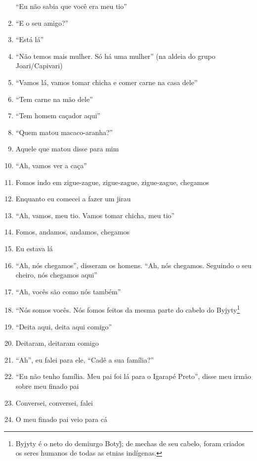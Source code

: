 \begin{enumerate}
 ``Eu não sabia que você era meu tio''
 \begin{center}\end{center}
 \item ``E o seu amigo?''
 \item ``Está lá''
 \item ``Não temos mais mulher. Só há uma mulher'' (na aldeia do grupo
 Joari/Capivari)
 \item ``Vamos lá, vamos tomar chicha e comer carne na casa dele''
 \item ``Tem carne na mão dele''
 \item ``Tem homem caçador aqui''
 \item ``Quem matou macaco-aranha?''
 \item Aquele que matou disse para mim
 \item ``Ah, vamos ver a caça''
 \item Fomos indo em zigue-zague, zigue-zague, zigue-zague, chegamos
 \item Enquanto eu comecei a fazer um jirau
 \item ``Ah, vamos, meu tio. Vamos tomar chicha, meu tio''
 \begin{center}\end{center}
 \item Fomos, andamos, andamos, chegamos
 \item Eu estava lá
 \item ``Ah, nós chegamos'', disseram os homens. ``Ah, nós chegamos.
 Seguindo o seu cheiro, nós chegamos aqui''
 \item ``Ah, vocês são como nós também''
 \item ``Nós somos vocês. Nós fomos feitos da mesma parte do cabelo do
 Byjyty\footnote{Byjyty é o neto do demiurgo Botyj̃;  de mechas de seu
   cabelo, foram criados os seres humanos de todas as etnias indígenas.}
 \item ``Deita aqui, deita aqui comigo''
 \item Deitaram, deitaram comigo
 \item ``Ah'', eu falei para ele, ``Cadê a sua família?''
 \item ``Eu não tenho família. Meu pai foi lá para o Igarapé Preto'', disse
 meu irmão sobre meu finado pai
 \begin{center}\end{center}
 \item Conversei, conversei, falei
 \item O meu finado pai veio para cá

\end{enumerate}
